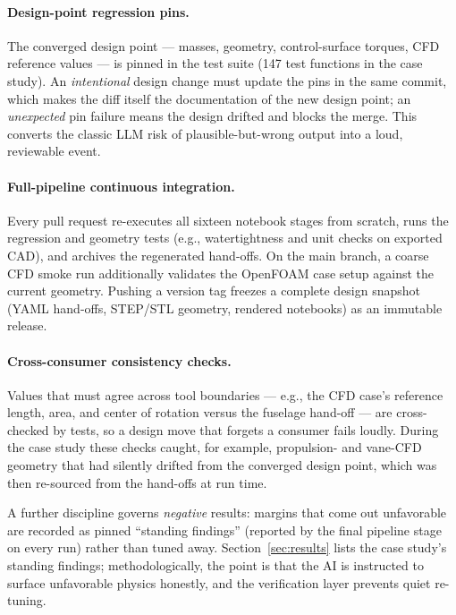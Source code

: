 \paragraph{Design-point regression pins.} The converged design point
--- masses, geometry, control-surface torques, CFD reference values
--- is pinned in the test suite (147 test functions in the case
study). An \emph{intentional} design change must update the pins in
the same commit, which makes the diff itself the documentation of the
new design point; an \emph{unexpected} pin failure means the design
drifted and blocks the merge. This converts the classic LLM risk of
plausible-but-wrong output into a loud, reviewable event.

\paragraph{Full-pipeline continuous integration.} Every pull request
re-executes all sixteen notebook stages from scratch, runs the
regression and geometry tests (e.g., watertightness and unit checks on
exported CAD), and archives the regenerated hand-offs. On the main
branch, a coarse CFD smoke run additionally validates the OpenFOAM
case setup against the current geometry. Pushing a version tag
freezes a complete design snapshot (YAML hand-offs, STEP/STL geometry,
rendered notebooks) as an immutable release.

\paragraph{Cross-consumer consistency checks.} Values that must agree
across tool boundaries --- e.g., the CFD case's reference length,
area, and center of rotation versus the fuselage hand-off --- are
cross-checked by tests, so a design move that forgets a consumer fails
loudly. During the case study these checks caught, for example,
propulsion- and vane-CFD geometry that had silently drifted from the
converged design point, which was then re-sourced from the hand-offs
at run time.

A further discipline governs \emph{negative} results: margins that
come out unfavorable are recorded as pinned ``standing findings''
(reported by the final pipeline stage on every run) rather than tuned
away. Section~\ref{sec:results} lists the case study's standing
findings; methodologically, the point is that the AI is instructed to
surface unfavorable physics honestly, and the verification layer
prevents quiet re-tuning.

